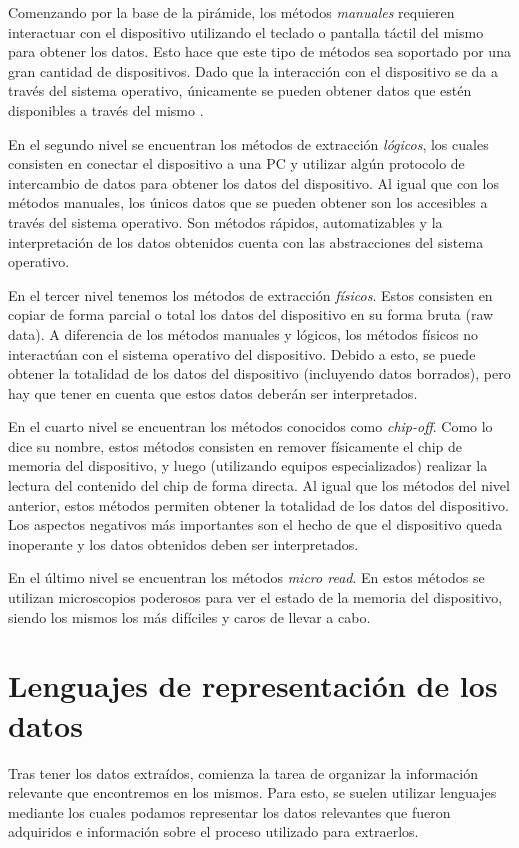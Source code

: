 Comenzando por la base de la pirámide, los métodos \emph{manuales} requieren interactuar con el dispositivo utilizando el teclado o pantalla táctil del mismo para obtener los datos. Esto hace que este tipo de métodos sea soportado por una gran cantidad de dispositivos. Dado que la interacción con el dispositivo se da a través del sistema operativo, únicamente se pueden obtener datos que estén disponibles a través del mismo \cite{chapter20}.

En el segundo nivel se encuentran los métodos de extracción \emph{lógicos}, los cuales consisten en conectar el dispositivo a una PC y utilizar algún protocolo de intercambio de datos para obtener los datos del dispositivo. Al igual que con los métodos manuales, los únicos datos que se pueden obtener son los accesibles a través del sistema operativo. Son métodos rápidos, automatizables y la interpretación de los datos obtenidos cuenta con las abstracciones del sistema operativo.

En el tercer nivel tenemos los métodos de extracción \emph{físicos}. Estos consisten en copiar de forma parcial o total los datos del dispositivo en su forma bruta (raw data). A diferencia de los métodos manuales y lógicos, los métodos físicos no interactúan con el sistema operativo del dispositivo. Debido a esto, se puede obtener la totalidad de los datos del dispositivo (incluyendo datos borrados), pero hay que tener en cuenta que estos datos deberán ser interpretados.

En el cuarto nivel se encuentran los métodos conocidos como \emph{chip-off}. Como lo dice su nombre, estos métodos consisten en remover físicamente el chip de memoria del dispositivo, y luego (utilizando equipos especializados) realizar la lectura del contenido del chip de forma directa. Al igual que los métodos del nivel anterior, estos métodos permiten obtener la totalidad de los datos del dispositivo. Los aspectos negativos más importantes son el hecho de que el dispositivo queda inoperante y los datos obtenidos deben ser interpretados.

En el último nivel se encuentran los métodos \emph{micro read}. En estos métodos se utilizan microscopios poderosos para ver el estado de la memoria del dispositivo, siendo los mismos los más difíciles y caros de llevar a cabo.

\section{Lenguajes de representación de los datos}
Tras tener los datos extraídos, comienza la tarea de organizar la información relevante que encontremos en los mismos. Para esto, se suelen utilizar lenguajes mediante los cuales podamos representar los datos relevantes que fueron adquiridos e información sobre el proceso utilizado para extraerlos.

